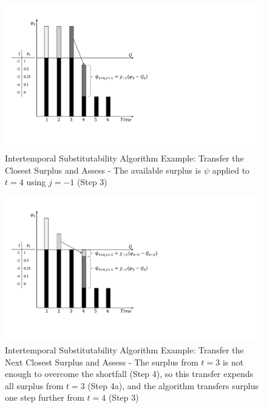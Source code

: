 \begin{figure}[h]
  \centering\includegraphics[width=\textwidth]{figures/Chi2-2.pdf}
  \caption{Intertemporal Substitutability Algorithm Example: Transfer
    the Closest Surplus and Assess - The available surplus is $\psi$
    applied to $t=4$ using $j={-1}$ (Step 3)}
  \label{f:Chi2-2}
\end{figure}


\begin{figure}[h]
  \centering\includegraphics[width=\textwidth]{figures/Chi2-3.pdf}
  \caption{Intertemporal Substitutability Algorithm Example: Transfer
    the Next Closest Surplus and Assess - The surplus from $t=3$ is
    not enough to overcome the shortfall (Step 4), so this transfer
    expends all surplus from $t=3$ (Step 4a), and the algorithm
    transfers surplus one step further from $t=4$ (Step 3)}
  \label{f:Chi2-3}
\end{figure}


